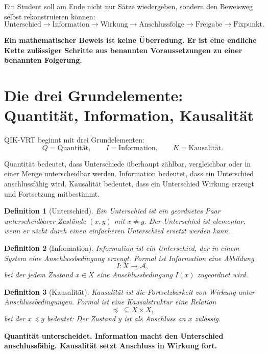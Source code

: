 \documentclass[11pt,a4paper,oneside]{scrartcl}
\theoremstyle{qikstyle}
\newtheorem{definition}{Definition}[section]
\newcommand{\A}{\mathcal{A}}
\newenvironment{merksatz}{\begin{center}\begin{minipage}{0.92\linewidth}\sffamily\bfseries}{\end{minipage}\end{center}}
\begin{document}
Ein Student soll am Ende nicht nur Sätze wiedergeben, sondern den Beweisweg selbst rekonstruieren können:
\[
\text{Unterschied} \to \text{Information} \to \text{Wirkung} \to \text{Anschlussfolge} \to \text{Freigabe} \to \text{Fixpunkt}.
\]

\begin{merksatz}
Ein mathematischer Beweis ist keine Überredung. Er ist eine endliche Kette zulässiger Schritte aus benannten Voraussetzungen zu einer benannten Folgerung.
\end{merksatz}

\newpage
\section{Die drei Grundelemente: Quantität, Information, Kausalität}

QIK-VRT beginnt mit drei Grundelementen:
\[
Q = \text{Quantität}, \qquad I = \text{Information}, \qquad K = \text{Kausalität}.
\]

Quantität bedeutet, dass Unterschiede überhaupt zählbar, vergleichbar oder in einer Menge unterscheidbar werden. Information bedeutet, dass ein Unterschied anschlussfähig wird. Kausalität bedeutet, dass ein Unterschied Wirkung erzeugt und Fortsetzung mitbestimmt.

\begin{definition}[Unterschied]
Ein Unterschied ist ein geordnetes Paar unterscheidbarer Zustände \((x,y)\) mit \(x \neq y\). Der Unterschied ist elementar, wenn er nicht durch einen einfacheren Unterschied ersetzt werden kann.
\end{definition}

\begin{definition}[Information]
Information ist ein Unterschied, der in einem System eine Anschlussbedingung erzeugt. Formal ist Information eine Abbildung
\[
I : X \to \A,
\]
bei der jedem Zustand \(x \in X\) eine Anschlussbedingung \(I(x)\) zugeordnet wird.
\end{definition}

\begin{definition}[Kausalität]
Kausalität ist die Fortsetzbarkeit von Wirkung unter Anschlussbedingungen. Formal ist eine Kausalstruktur eine Relation
\[
\preceq \; \subseteq X \times X,
\]
bei der \(x \preceq y\) bedeutet: Der Zustand \(y\) ist als Anschluss an \(x\) zulässig.
\end{definition}

\begin{merksatz}
Quantität unterscheidet. Information macht den Unterschied anschlussfähig. Kausalität setzt Anschluss in Wirkung fort.
\end{merksatz}
\end{document}

